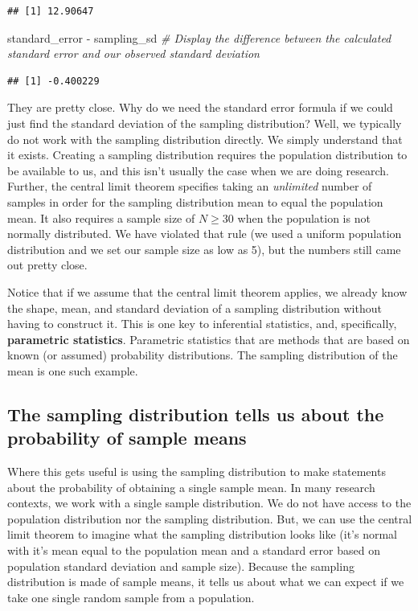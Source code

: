 \documentclass[
]{book}
\newenvironment{Shaded}{\begin{snugshade}}{\end{snugshade}}
\newcommand{\CommentTok}[1]{\textcolor[rgb]{0.56,0.35,0.01}{\textit{#1}}}
\newcommand{\NormalTok}[1]{#1}
\newcommand{\SpecialCharTok}[1]{\textcolor[rgb]{0.00,0.00,0.00}{#1}}
\begin{document}
\begin{verbatim}
## [1] 12.90647
\end{verbatim}

\begin{Shaded}
\begin{Highlighting}[]
\NormalTok{standard\_error }\SpecialCharTok{{-}}\NormalTok{ sampling\_sd }\CommentTok{\# Display the difference between the calculated standard error and our observed standard deviation}
\end{Highlighting}
\end{Shaded}

\begin{verbatim}
## [1] -0.400229
\end{verbatim}

They are pretty close. Why do we need the standard error formula if we could just find the standard deviation of the sampling distribution? Well, we typically do not work with the sampling distribution directly. We simply understand that it exists. Creating a sampling distribution requires the population distribution to be available to us, and this isn't usually the case when we are doing research. Further, the central limit theorem specifies taking an \emph{unlimited} number of samples in order for the sampling distribution mean to equal the population mean. It also requires a sample size of \(N\ge30\) when the population is not normally distributed. We have violated that rule (we used a uniform population distribution and we set our sample size as low as 5), but the numbers still came out pretty close.

Notice that if we assume that the central limit theorem applies, we already know the shape, mean, and standard deviation of a sampling distribution without having to construct it. This is one key to inferential statistics, and, specifically, \textbf{parametric statistics}. Parametric statistics that are methods that are based on known (or assumed) probability distributions. The sampling distribution of the mean is one such example.

\hypertarget{the-sampling-distribution-tells-us-about-the-probability-of-sample-means}{%
\subsection{The sampling distribution tells us about the probability of sample means}\label{the-sampling-distribution-tells-us-about-the-probability-of-sample-means}}

Where this gets useful is using the sampling distribution to make statements about the probability of obtaining a single sample mean. In many research contexts, we work with a single sample distribution. We do not have access to the population distribution nor the sampling distribution. But, we can use the central limit theorem to imagine what the sampling distribution looks like (it's normal with it's mean equal to the population mean and a standard error based on population standard deviation and sample size). Because the sampling distribution is made of sample means, it tells us about what we can expect if we take one single random sample from a population.
\end{document}
